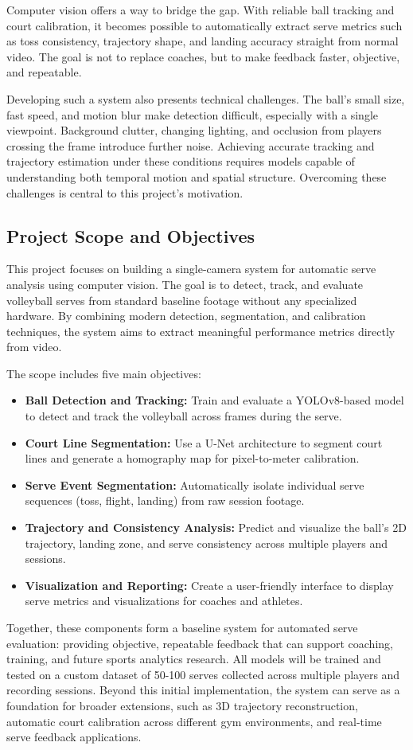 Computer vision offers a way to bridge the gap. With reliable ball tracking and court calibration, it becomes possible to automatically extract serve metrics such as toss consistency, trajectory shape, and landing accuracy straight from normal video. The goal is not to replace coaches, but to make feedback faster, objective, and repeatable. 

Developing such a system also presents technical challenges. The ball's small size, fast speed, and motion blur make detection difficult, especially with a single viewpoint. Background clutter, changing lighting, and occlusion from players crossing the frame introduce further noise. Achieving accurate tracking and trajectory estimation under these conditions requires models capable of understanding both temporal motion and spatial structure. Overcoming these challenges is central to this project's motivation.

\subsection{Project Scope and Objectives}
This project focuses on building a single-camera system for automatic serve analysis using computer vision. The goal is to detect, track, and evaluate volleyball serves from standard baseline footage without any specialized hardware. By combining modern detection, segmentation, and calibration techniques, the system aims to extract meaningful performance metrics directly from video.

The scope includes five main objectives:
\begin{itemize}
    \item \textbf{Ball Detection and Tracking:} Train and evaluate a YOLOv8-based model to detect and track the volleyball across frames during the serve.
    \item \textbf{Court Line Segmentation:} Use a U-Net architecture to segment court lines and generate a homography map for pixel-to-meter calibration.
    \item \textbf{Serve Event Segmentation:} Automatically isolate individual serve sequences (toss, flight, landing) from raw session footage.
    \item \textbf{Trajectory and Consistency Analysis:} Predict and visualize the ball's 2D trajectory, landing zone, and serve consistency across multiple players and sessions.
    \item \textbf{Visualization and Reporting:} Create a user-friendly interface to display serve metrics and visualizations for coaches and athletes.
\end{itemize}

Together, these components form a baseline system for automated serve evaluation: providing objective, repeatable feedback that can support coaching, training, and future sports analytics research. All models will be trained and tested on a custom dataset of 50-100 serves collected across multiple players and recording sessions. Beyond this initial implementation, the system can serve as a foundation for broader extensions, such as 3D trajectory reconstruction, automatic court calibration across different gym environments, and real-time serve feedback applications.